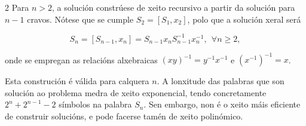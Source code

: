 \begin{refsection}
\begin{multicols}{2}
Para $n>2$, a solución constrúese de xeito recursivo a partir da solución para
$n-1$ cravos. Nótese que se cumple $S_2 = [S_1,x_2]$, polo que a solución xeral
será

\begin{equation}
    S_n = [S_{n-1},x_n] = S_{n-1} x_n S_{n-1}^{-1} x_n^{-1},
    ~~ \forall n \geq 2,
\end{equation}

\noindent onde se empregan as relacións
alxebraicas $(x y)^{-1} = y^{-1} x^{-1}$ e $(x^{-1})^{-1} = x$.

Esta construción é válida para calquera $n$. A lonxitude das palabras que son
solución ao problema medra de xeito exponencial, tendo concretamente $2^n +
2^{n-1} - 2$ símbolos na palabra $S_n$. Sen embargo, non é o xeito máis
eficiente de construir solucións, e pode facerse tamén de xeito polinómico.

\cite{demaine.ed.demaine.ml.minsky.yn.etal_2013}
\printbibliography

\end{multicols}
\end{refsection}
